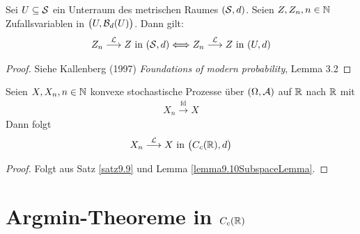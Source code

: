 \begin{lemma}\label{lemma9.10SubspaceLemma}\enter
	Sei $U\subseteq\S$ ein Unterraum des metrischen Raumes $(\S,d)$.
	Seien $Z,Z_n,n\in\N$ Zufallsvariablen in $\big(U,\B_d(U)\big)$.
	Dann gilt:
	\begin{align*}
		Z_n\overset{\L}{\longrightarrow} Z\text{ in }(\S,d)
		\Longleftrightarrow
		Z_n\overset{\L}{\longrightarrow} Z\text{ in }(U,d)
	\end{align*}
\end{lemma}

\begin{proof}
	Siehe Kallenberg (1997) \textit{Foundations of modern probability}, Lemma 3.2
\end{proof}

\begin{korollar}\label{korollar9.11}
	Seien $X,X_n,n\in\N$ konvexe stochastische Prozesse über $(\Omega,\A)$ auf $\R$ nach $\R$ mit 
	\begin{align*}
		X_n\overset{\text{fd}}{\longrightarrow}X
	\end{align*}
	Dann folgt
	\begin{align*}
		X_n\overset{\L}{\longrightarrow} X\text{ in }\big(C_c(\R),d\big)
	\end{align*}
\end{korollar}

\begin{proof}
	Folgt aus Satz \ref{satz9.9} und Lemma \ref{lemma9.10SubspaceLemma}.
\end{proof}

\section{Argmin-Theoreme in \texorpdfstring{$C_c(\R)$}{C\_c(R)}}

